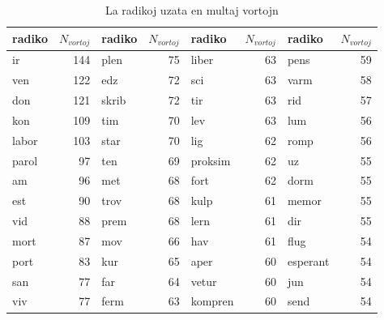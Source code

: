 \documentclass[12pt,twoside]{article}
\begin{document}
\vspace{.2 in}
\begin{table}[h!]
\begin{center}
\begin{tabular}{ |l|r||l|r||l|r||l|r| }
\hline
radiko& $N_{vortoj}$ & radiko & $N_{vortoj}$ & radiko & $N_{vortoj}$& radiko & $N_{vortoj}$ \\
\hline
ir       &144 & plen      &75 & liber    &   63 &pens         & 59\\
ven      &122 & edz       &72 & sci      &   63 &varm         & 58\\
don      &121 & skrib     &72 & tir      &   63 &rid          & 57\\
kon      &109 & tim       &70 & lev      &   63 &lum          & 56\\
labor    &103 & star      &70 & lig      &   62 &romp         & 56\\
parol     &97 & ten       &69 & proksim  &   62 &uz           & 55\\
am        &96 & met       &68 & fort     &   62 &dorm         & 55\\
est       &90 & trov      &68 & kulp     &   61 &memor        & 55 \\
vid       &88 & prem      &68 & lern     &   61 &dir          & 55\\
mort      &87 & mov       &66 & hav      &   61 &flug         & 54\\
port      &83 & kur       &65 & aper     &   60 &esperant     & 54\\
san       &77 & far       &64 & vetur    &   60 &jun          & 54\\
viv       &77 & ferm      &63 & kompren  &   60 &send         & 54\\ 

\hline
\end{tabular}
\caption{La radikoj uzata en multaj vortojn}\label{table:plejmultaj}
\end{center}
\end{table}
\vspace{.2 in}
\end{document}

